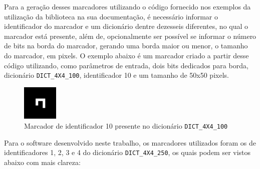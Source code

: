 \documentclass[12pt]{report}
\begin{document}
{Para a geração desses marcadores utilizando o código fornecido nos exemplos da utilização da biblioteca na sua documentação, é necessário informar o identificador do marcador e um dicionário dentre dezesseis diferentes, no qual o marcador está presente, além de, opcionalmente ser possível se informar o número de bits na borda do marcador, gerando uma borda maior ou menor, o tamanho do marcador, em pixels. O exemplo abaixo é um marcador criado a partir desse código utilizando, como parâmetros de entrada, dois bits dedicados para borda, dicionário \texttt{DICT\_4X4\_100}, identificador 10 e um tamanho de 50x50 pixels. 

\begin{figure}[H]
  \centering
    \includegraphics[width=0.15\textwidth]{imagens/marker.png}
    \caption{Marcador de identificador 10 presente no dicionário \texttt{DICT\_4X4\_100}}
  \label{fig:markers210}
\end{figure}

Para o software desenvolvido neste trabalho, os marcadores utilizados foram os de identificadores 1, 2, 3 e 4 do dicionário \texttt{DICT\_4X4\_250}, os quais podem ser vistos abaixo com mais clareza:

}
\end{document}
